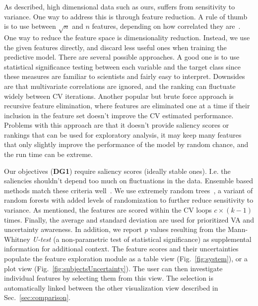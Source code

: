 \noindent As described, high dimensional data such as ours, suffers from sensitivity to variance. One way to address this is through feature reduction. A rule of thumb is to use between $\sqrt{n}$ and $n$ features, depending on how correlated they are~\cite{hua2004optimal}. One way to reduce the feature space is dimensionality reduction. %
Instead, we use the given features directly, and discard less useful ones when training the predictive model. There are several possible approaches. A good one is to use statistical significance testing between each variable and the target class since these measures are familiar to scientists and fairly easy to interpret.  Downsides are that multivariate correlations are ignored, and the ranking can fluctuate widely between CV iterations. Another popular but brute force approach is recursive feature elimination, where features are eliminated one at a time if their inclusion in the feature set doesn't improve the CV estimated performance. Problems with this approach are that it doesn't provide saliency scores or rankings that can be used for exploratory analysis, it may keep many features that only slightly improve the performance of the model by random chance, and the run time can be extreme. 

Our objectives (\textbf{DG1}) require saliency scores (ideally stable ones). I.e. the saliencies shouldn't depend too much on fluctuations in the data. Ensemble based methods match these criteria well~\cite{saeys2008robust}. We use extremely random trees~\cite{geurts2006extremely}, a variant of random forests with added levels of randomization to further reduce sensitivity to variance. As mentioned, the features are scored within the CV loops $c\times(k-1)$ times. Finally, the average and standard deviation are used for prioritized VA and uncertainty awareness. In addition, we report \textit{p} values resulting from the Mann-Whitney \textit{U-test} (a non-parametric test of statistical significance) as supplemental information for additional context. The feature scores and their uncertainties populate the feature exploration module as a table view (Fig.~\ref{fig:system}), or a plot view (Fig.~\ref{fig:subjectsUncertainty}). The user can then investigate individual features by selecting them from this view. The selection is automatically linked between the other visualization view described in Sec.~\ref{sec:comparison}. 


